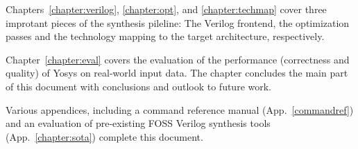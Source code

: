 Chapters~\ref{chapter:verilog}, \ref{chapter:opt}, and \ref{chapter:techmap} 
cover three improtant pieces of the synthesis pileline: The Verilog frontend,
the optimization passes and the technology mapping to the target architecture,
respectively.

Chapter~\ref{chapter:eval} covers the evaluation of the performance
(correctness and quality) of Yosys on real-world input data.
The chapter concludes the main part of this document with conclusions and
outlook to future work.

Various appendices, including a command reference manual
(App.~\ref{commandref}) and an evaluation of pre-existing FOSS Verilog
synthesis tools (App.~\ref{chapter:sota}) complete this document.


